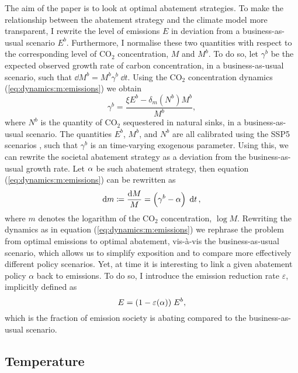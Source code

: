 \documentclass[../../main.tex]{subfiles}
\begin{document}
The aim of the paper is to look at optimal abatement strategies. To make the relationship between the abatement strategy and the climate model more transparent, I rewrite the level of emissions $E$ in deviation from a business-as-usual scenario $E^{b}$. Furthermore, I normalise these two quantities with respect to the corresponding level of CO$_2$ concentration, $M$ and $M^{b}$. To do so, let $\gamma^{b}$ be the expected observed growth rate of carbon concentration, in a business-as-usual scenario, such that $\dd{M^{b}} = M^{b} \gamma^{b} \; \dd{t}$. Using the CO$_2$ concentration dynamics (\ref{eq:dynamics:m:emissions}) we obtain \begin{equation} \label{eq:growth-rate-bau}
    \gamma^{b} = \frac{\xi E^{b} - \delta_m(N^{b}) M^{b}}{M^{b}},
\end{equation} where $N^{b}$ is the quantity of CO$_2$ sequestered in natural sinks, in a business-as-usual scenario. The quantities $E^{b}$, $M^{b}$, and $N^{b}$ are all calibrated using the SSP5 scenarios \citep{intergovernmental_panel_on_climate_change_climate_2023}, such that $\gamma^{b}$ is an time-varying exogenous parameter. Using this, we can rewrite the societal abatement strategy as a deviation from the business-as-usual growth rate. Let $\alpha$ be such abatement strategy, then equation (\ref{eq:dynamics:m:emissions}) can be rewritten as \begin{equation} \label{eq:dynamics:m:abatement}
    \dd{m} \coloneqq \frac{\dd{M}}{M} = \Big( \gamma^{b} - \alpha \Big)\; \dd{t},
\end{equation} where $m$ denotes the logarithm of the CO$_2$ concentration, $\log M$. Rewriting the dynamics as in equation (\ref{eq:dynamics:m:emissions}) we rephrase the problem from optimal emissions to optimal abatement, vis-à-vis the business-as-usual scenario, which allows us to simplify exposition and to compare more effectively different policy scenarios. Yet, at time it is interesting to link a given abatement policy $\alpha$ back to emissions. To do so, I introduce the emission reduction rate $\varepsilon$, implicitly defined as \begin{equation} \label{eq:emission-reduction-rate}
    E = (1 - \varepsilon(\alpha)) \; E^{b},
\end{equation} which is the fraction of emission society is abating compared to the business-as-usual scenario.

\subsection{Temperature}
\end{document}
